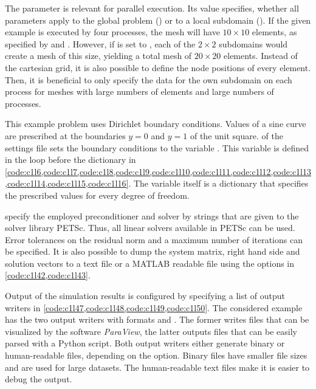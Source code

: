 The parameter  is relevant for parallel execution. Its value specifies, whether all parameters apply to the global problem () or to a local subdomain (). If the given example is executed by four processes, the mesh will have $10\times 10$ elements, as specified by  and . 
However, if  is set to , each of the $2\times 2$ subdomains would create a mesh of this size, yielding a total mesh of $20 \times 20$ elements. Instead of the cartesian grid, it is also possible to define the node positions of every element. Then, it is beneficial to only specify the data for the own subdomain on each process for meshes with large numbers of elements and large numbers of processes.

This example problem uses Dirichlet boundary conditions. Values of a sine curve are prescribed at the boundaries $y=0$ and $y=1$ of the unit square.  of the settings file sets the boundary conditions to the variable . This variable is defined in the loop before the  dictionary in \cref{code:c1l6,code:c1l7,code:c1l8,code:c1l9,code:c1l10,code:c1l11,code:c1l12,code:c1l13,code:c1l14,code:c1l15,code:c1l16}. The  variable itself is a dictionary that specifies the prescribed values for every degree of freedom. 

 specify the employed preconditioner and solver by strings that are given to the solver library PETSc. Thus, all linear solvers available in PETSc can be used.
Error tolerances on the residual norm and a maximum number of iterations can be specified. It is also possible to dump the system matrix, right hand side and solution vectors to a text file or a MATLAB readable file using the options in \cref{code:c1l42,code:c1l43}.

Output of the simulation results is configured by specifying a list of output writers in \cref{code:c1l47,code:c1l48,code:c1l49,code:c1l50}. The considered example has the two output writers with formats  and . The former writes files that can be visualized by the software \emph{ParaView}, the latter outputs files that can be easily parsed with a Python script. Both output writers either generate binary or human-readable files, depending on the  option. Binary files have smaller file sizes and are used for large datasets. The human-readable text files make it is easier to debug the output.

